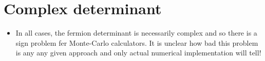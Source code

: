 \section{Complex determinant}
\begin{itemize}
  \item In all cases, the fermion determinant is necessarily complex and so there is a sign problem fer Monte-Carlo calculators. It is unclear how bad this problem is any any given approach and only actual numerical implementation will tell!
\end{itemize}

